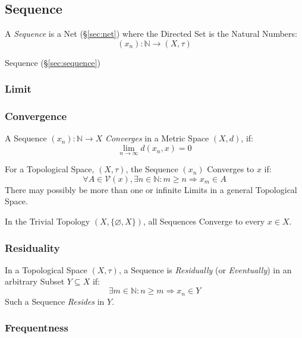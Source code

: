 \subsection{Sequence}\label{sec:sequence_topology}

A \emph{Sequence} is a Net (\S\ref{sec:net}) where the Directed Set is
the Natural Numbers:
\[
  (x_n) : \mathbb{N} \rightarrow (X,\tau)
\]

Sequence (\S\ref{sec:sequence})



\subsubsection{Limit}\label{sec:limit_topology}

\subsubsection{Convergence}\label{sec:convergence_topology}

A Sequence $(x_n) : \mathbb{N} \rightarrow X$
\emph{Converges} in a Metric Space $(X,d)$, if:
\[
  \lim_{n \rightarrow \infty} d (x_n, x) = 0
\]

For a Topological Space, $(X,\tau)$, the Sequence $(x_n)$ Converges to
$x$ if:
\[
  \forall A \in \mathcal{V}(x), \exists n \in \mathbb{N}
  : m \geq n \Rightarrow x_m \in A
\]
There may possibly be more than one or infinite Limits in a general
Topological Space.

In the Trivial Topology $(X, \{\varnothing, X\})$, all Sequences
Converge to every $x \in X$.



\subsubsection{Residuality}\label{sec:reside}

In a Topological Space $(X, \tau)$, a Sequence is \emph{Residually}
(or \emph{Eventually}) in an arbitrary Subset $Y \subseteq X$ if:
\[
  \exists m \in \mathbb{N} : n \geq m \Rightarrow x_n \in Y
\]
Such a Sequence \emph{Resides} in $Y$.



\subsubsection{Frequentness}\label{sec:frequent}

